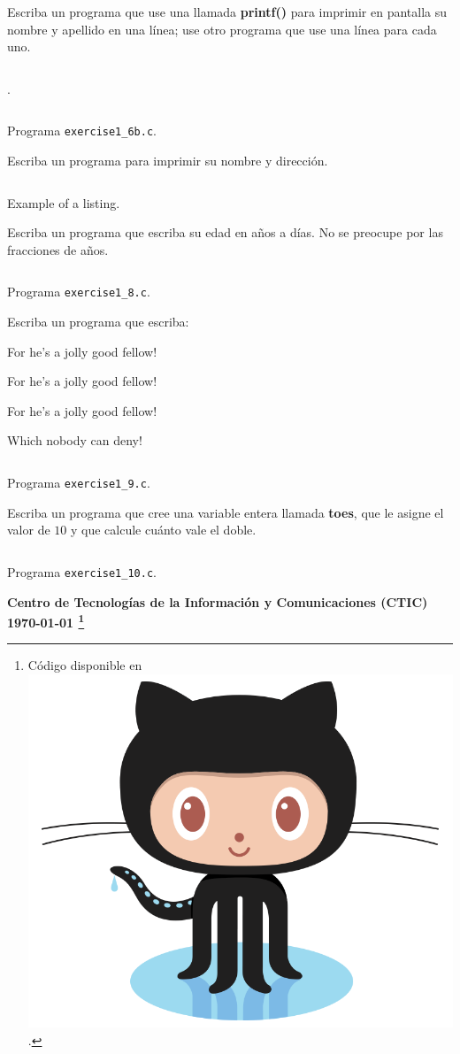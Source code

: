 \documentclass[spanish,addpoints,answers,a4paper]{exam}
\newcommand{\unmarkedfntext}[1]{%
	\begingroup
	\renewcommand\thefootnote{}\footnote{#1}%
	\addtocounter{footnote}{-1}%
	\endgroup
}
\newcommand{\mychar}{%
	\begingroup\normalfont
	\includegraphics[height=\fontcharht\font`\B]{Octocat.png}%
	\endgroup
}
\begin{document}
\begin{questions}
\question Escriba un programa que use una llamada \textbf{printf()} para imprimir en pantalla su nombre y apellido en una línea; use otro programa que use una línea para cada uno.

\begin{solution}
\begin{listing}[H]
\footnotesize
\inputminted{c}{exercise1_6a.c}.
\label{lst:6a}
\end{listing}
\begin{listing}[H]
\footnotesize
\inputminted{c}{exercise1_6b.c}
\caption{Programa \texttt{exercise1\_6b.c}.}
\label{lst:6b}
\end{listing}
\end{solution}

\question Escriba un programa para imprimir su nombre y dirección.

\begin{solution}
\begin{listing}[H]
\footnotesize
\inputminted{c}{exercise1_7.c}
\caption{Example of a listing.}
\label{lst:7}
\end{listing}
\end{solution}

\question Escriba un programa que escriba su edad en años a días. No se preocupe por las fracciones de años.

\begin{solution}%
\begin{listing}[H]
\footnotesize
\inputminted{c}{exercise1_8.c}
\caption{Programa \texttt{exercise1\_8.c}.}
\label{lst:8}
\end{listing}
\end{solution}

\question Escriba un programa que escriba:

For he's a jolly good fellow!

For he's a jolly good fellow!

For he's a jolly good fellow!

Which nobody can deny!

\begin{solution}
\begin{listing}[H]
\footnotesize
\inputminted{c}{exercise1_9.c}
\caption{Programa \texttt{exercise1\_9.c}.}
\label{lst:9}
\end{listing}
\end{solution}

\question Escriba un programa que cree una variable entera llamada \textbf{toes}, que le asigne el valor de $10$ y que calcule cuánto vale el doble.

\begin{solution}
\begin{listing}[H]
\footnotesize
\inputminted{c}{exercise1_10.c}
\caption{Programa \texttt{exercise1\_10.c}.}
\label{lst:10}
\end{listing}
\end{solution}

\end{questions}
\begin{flushright}\bfseries
Centro de Tecnologías de la Información y Comunicaciones (CTIC)\\[2mm]
\today\unmarkedfntext{Código disponible en \href{https://github.com/carlosal1015/C-Programming}{\mychar{}}.}
\end{flushright}
\end{document}
